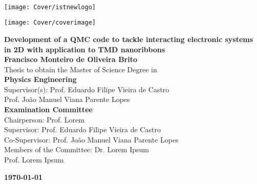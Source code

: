 \setcounter{page}{1} 


\thispagestyle{empty}

\begin{flushleft} ~\\ \vspace{-12mm} \hspace{-12mm}
\texttt{[image: Cover/istnewlogo]}
\vspace{10mm}
\\ \begin{center} \texttt{[image: Cover/coverimage]}  \end{center} %
 \vspace{5mm}
\centering
\LARGE \textbf{Development of a QMC code to tackle interacting electronic systems in 2D with application to TMD nanoribbons}
\\
\vspace{15mm}
\Large \textbf{Francisco Monteiro de Oliveira Brito} \\
\vspace{12mm}
\large Thesis to obtain the Master of Science Degree in
\\ \vspace{2mm}
\LARGE \textbf{Physics Engineering}
\\ \vspace{10mm}
\large Supervisor(s): Prof. Eduardo Filipe Vieira de Castro  \\
\large Prof. João Manuel Viana Parente Lopes 
\\ \vspace{15mm}
\Large \textbf{Examination Committee}
\\ \vspace{5mm}
\large Chairperson:	Prof. Lorem \\
\large Supervisor: Prof. Eduardo Filipe Vieira de Castro \\
\large Co-Supervisor: Prof. João Manuel Viana Parente Lopes  \\
\large Members of the Committee: Dr. Lorem Ipsum \\
Prof. Lorem Ipsum
 
\vspace{15mm}

\Large \textbf{\todaythesis\today} \\
\let\thepage\relax
\end{flushleft}
\pagebreak


\clearpage

\thispagestyle{empty}
\cleardoublepage

\setcounter{page}{1} 

\baselineskip 18pt %

